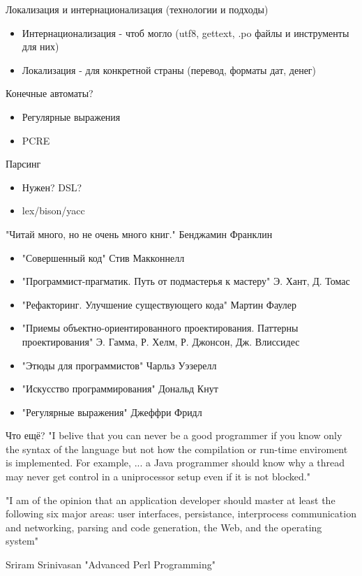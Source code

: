 \documentclass[aspectratio=169]{beamer}
\begin{document}
\begin{frame}{Локализация и интернационализация (технологии и подходы)}
\begin{itemize}
\item Интернационализация - чтоб могло (utf8, gettext, .po файлы и инструменты для них)
\pause
\item Локализация - для конкретной страны (перевод, форматы дат, денег)
\end{itemize}
\end{frame}

\begin{frame}{Конечные автоматы?}
\begin{itemize}
\item Регулярные выражения
\pause
\item PCRE
\end{itemize}
\end{frame}

\begin{frame}{Парсинг}
\begin{itemize}
\item Нужен? DSL?
\pause
\item lex/bison/yacc
\end{itemize}
\end{frame}


\begin{frame}{"Читай много, но не очень много книг." Бенджамин Франклин}
\begin{itemize}
\item "Совершенный код" Стив Макконнелл
\pause
\item "Программист-прагматик. Путь от подмастерья к мастеру" Э. Хант, Д. Томас
\pause
\item "Рефакторинг. Улучшение существующего кода" Мартин Фаулер
\pause
\item "Приемы объектно-ориентированного проектирования. Паттерны проектирования" Э. Гамма, Р. Хелм, Р. Джонсон, Дж. Влиссидес
\pause
\item "Этюды для программистов" Чарльз Уэзерелл
\pause
\item "Искусство программирования" Дональд Кнут
\pause
\item "Регулярные выражения" Джеффри Фридл
\end{itemize}
\end{frame}

\begin{frame}{Что ещё?}
"I belive that you can never be a good programmer if you know only the syntax of the language but not how the compilation or run-time enviroment is implemented. For example, ... a Java programmer should know why a thread may never get control in a uniprocessor setup even if it is not blocked."

"I am of the opinion that an application developer should master at least the following six major areas: user interfaces, persistance, interprocess communication and networking, parsing and code generation, the Web, and the operating system"

Sriram Srinivasan "Advanced Perl Programming"
\end{frame}
\end{document}
